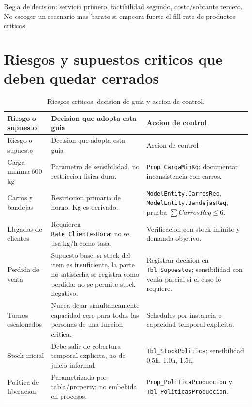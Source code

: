 \documentclass[11pt]{article}
\newcommand{\tabla}[1]{\texttt{#1}}
\newcommand{\state}[1]{\texttt{#1}}
\begin{document}
Regla de decision: servicio primero, factibilidad segundo, costo/sobrante tercero. No escoger un escenario mas barato si empeora fuerte el fill rate de productos criticos.

\section{Riesgos y supuestos criticos que deben quedar cerrados}

\begin{longtable}{L{4.0cm}L{5.4cm}L{4.6cm}}
\caption{Riesgos criticos, decision de guia y accion de control.}\\
\toprule
{}
\color{white}Riesgo o supuesto & \color{white}Decision que adopta esta guia & \color{white}Accion de control \\
\midrule
\endfirsthead
\toprule
{}
\color{white}Riesgo o supuesto & \color{white}Decision que adopta esta guia & \color{white}Accion de control \\
\midrule
\endhead
Carga minima 600 kg & Parametro de sensibilidad, no restriccion fisica dura. & \state{Prop\_CargaMinKg}; documentar inconsistencia con carros. \\
Carros y bandejas & Restriccion primaria de horno. Kg es derivado. & \state{ModelEntity.CarrosReq}, \state{ModelEntity.BandejasReq}, prueba \(\sum CarrosReq \leq 6\). \\
Llegadas de clientes & Requieren \tabla{Rate\_ClientesHora}; no se usa kg/h como tasa. & Verificacion con stock infinito y demanda objetivo. \\
Perdida de venta & Supuesto base: si stock del item es insuficiente, la parte no satisfecha se registra como perdida; no se permite stock negativo. & Registrar decision en \tabla{Tbl\_Supuestos}; sensibilidad con venta parcial si el caso lo requiere. \\
Turnos escalonados & Nunca dejar simultaneamente capacidad cero para todas las personas de una funcion critica. & Schedules por instancia o capacidad temporal explicita. \\
Stock inicial & Debe salir de cobertura temporal explicita, no de juicio informal. & \tabla{Tbl\_StockPolitica}; sensibilidad 0.5h, 1.0h, 1.5h. \\
Politica de liberacion & Parametrizada por tabla/property; no embebida en procesos. & \state{Prop\_PoliticaProduccion} y \tabla{Tbl\_PoliticasProduccion}. \\

\end{longtable}
\end{document}
